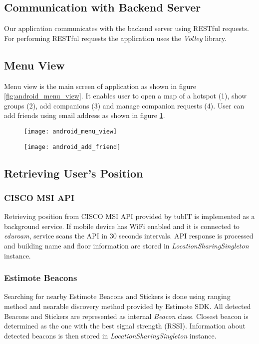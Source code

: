 \subsection{Communication with Backend Server}
Our application communicates with the backend server using RESTful requests. For performing RESTful requests the application uses the \textit{Volley} library.

\subsection{Menu View}
Menu view is the main screen of application as shown in figure \ref{fig:android_menu_view}. It enables user to open a map of a hotspot (1), show groups (2), add companions (3) and manage companion requests (4). User can add friends using email address as shown in figure \ref{fig:android_add_friend}.

\begin{figure}
\centering
\begin{minipage}{.5\textwidth}
  \centering
  \texttt{[image: android\_menu\_view]}
  \label{fig:android_menu_view}
\end{minipage}%
\begin{minipage}{.5\textwidth}
  \centering
  \texttt{[image: android\_add\_friend]}
  \label{fig:android_add_friend}
\end{minipage}
\end{figure}

\subsection{Retrieving User's Position}
\subsubsection{CISCO MSI API}
Retrieving position from CISCO MSI API provided by tubIT is implemented as a background service. If mobile device has WiFi enabled and it is connected to \textit{eduroam}, service scans the API in 30 seconds intervals. API response is processed and building name and floor information are stored in \textit{LocationSharingSingleton} instance.

\subsubsection{Estimote Beacons}
Searching for nearby Estimote Beacons and Stickers is done using ranging method and nearable discovery method provided by Estimote SDK. All detected Beacons and Stickers are represented as internal \textit{Beacon} class. Closest beacon is determined as the one with the best signal strength (RSSI). Information about detected beacons is then stored in \textit{LocationSharingSingleton} instance.


